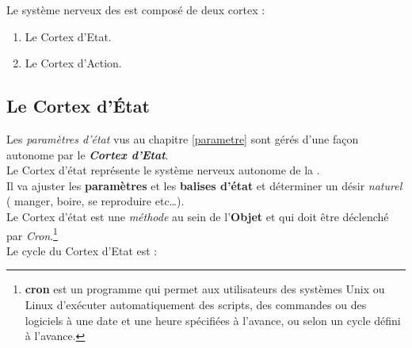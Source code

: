 \documentclass[french]{report}
\begin{document}
Le système nerveux des \CoCiX est composé de deux cortex :
\begin{enumerate}
	\item Le Cortex d'Etat.
	\item Le Cortex d'Action. \\
\end{enumerate}

\subsection{Le Cortex d'État}\label{cortex_etat}

Les \textit{paramètres d'état} vus au chapitre \ref{parametre} sont gérés d'une façon autonome par le \textit{\textbf{Cortex d'Etat}}.\\
Le Cortex d'état représente  le système nerveux autonome de la \CoCiX.\\
Il va ajuster les \textbf{paramètres} et les \textbf{balises d'état} et déterminer un désir \textit{naturel} ( manger, boire, se reproduire etc\dots).\\
Le Cortex d'état est une \textit{méthode} au sein de l'\textbf{Objet} \CoCiX et qui doit être déclenché par \textit{Cron}.\footnote{\textbf{cron} est un programme qui permet aux utilisateurs des systèmes Unix  ou Linux d'exécuter automatiquement des scripts, des commandes ou des logiciels à une date et une heure spécifiées à l'avance, ou selon un cycle défini à l'avance.}\\
Le cycle du Cortex d'Etat est :\\
\end{document}
